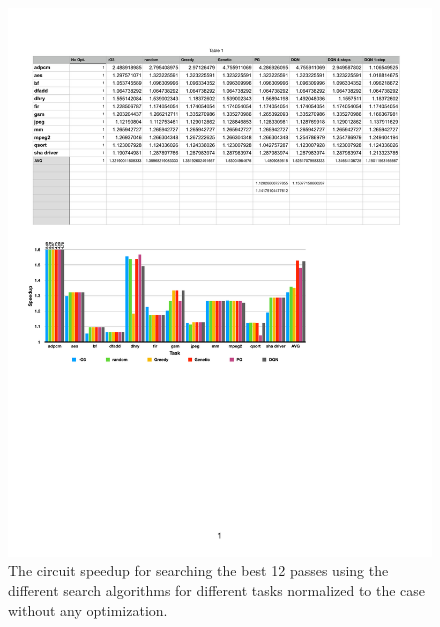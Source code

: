 \begin{figure}[!t]
    \centering        
    \includegraphics[trim={1.9cm 18cm 11.5cm 21.5cm},clip,width=\textwidth]{Figures/12passesv5.pdf} 
    \vspace{-0.7cm}
    \caption{The circuit speedup for searching the best 12 passes using the different search algorithms for different tasks normalized to the case without any optimization.%
    }
    \label{fig:12pass}
    \vspace{-0.6cm}
\end{figure}


